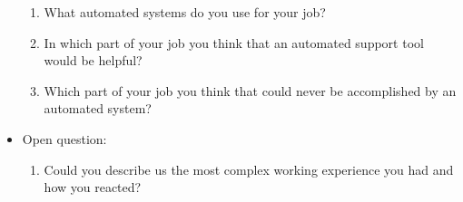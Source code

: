 \documentclass{article}
\begin{document}
\begin{itemize}
\begin{enumerate}
			\item What automated systems do you use for your job?
			
    		\item In which part of your job you think that an automated support tool would be helpful?
    		
   			\item Which part of your job you think that could never be accomplished by an automated system?
		\end{enumerate}    
    
    \item Open question:
    \begin{enumerate}
        \item Could you describe us the most complex working experience you had and how you reacted?
    \end{enumerate}

	\end{itemize}
\end{document}

